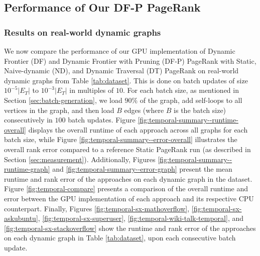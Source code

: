 \subsection{Performance of Our DF-P PageRank}

\subsubsection{Results on real-world dynamic graphs}

We now compare the performance of our GPU implementation of Dynamic Frontier (DF) and Dynamic Frontier with Pruning (DF-P) PageRank with Static, Naive-dynamic (ND), and Dynamic Traversal (DT) PageRank on real-world dynamic graphs from Table \ref{tab:dataset}. This is done on batch updates of size $10^{-5}|E_T|$ to $10^{-3}|E_T|$ in multiples of $10$. For each batch size, as mentioned in Section \ref{sec:batch-generation}, we load $90\%$ of the graph, add self-loops to all vertices in the graph, and then load $B$ edges (where $B$ is the batch size) consecutively in $100$ batch updates. Figure \ref{fig:temporal-summary--runtime-overall} displays the overall runtime of each approach across all graphs for each batch size, while Figure \ref{fig:temporal-summary--error-overall} illustrates the overall rank error compared to a reference Static PageRank run (as described in Section \ref{sec:measurement}). Additionally, Figures \ref{fig:temporal-summary--runtime-graph} and \ref{fig:temporal-summary--error-graph} present the mean runtime and rank error of the approaches on each dynamic graph in the dataset. Figure \ref{fig:temporal-compare} presents a comparison of the overall runtime and error between the GPU implementation of each approach and its respective CPU counterpart. Finally, Figures \ref{fig:temporal-sx-mathoverflow}, \ref{fig:temporal-sx-askubuntu}, \ref{fig:temporal-sx-superuser}, \ref{fig:temporal-wiki-talk-temporal}, and \ref{fig:temporal-sx-stackoverflow} show the runtime and rank error of the approaches on each dynamic graph in Table \ref{tab:dataset}, upon each consecutive batch update.



